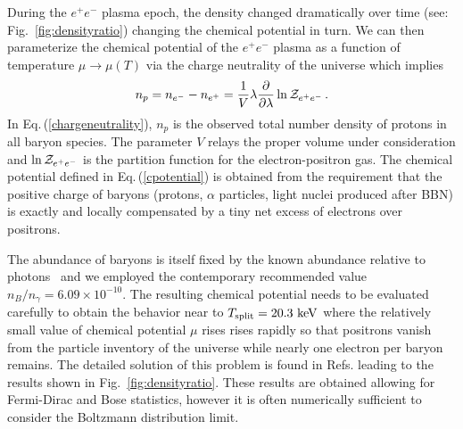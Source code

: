 \documentclass[reprint]{revtex4-2}
\newcommand*{\keV}{\text{ keV}}
\newcommand{\req}[1]{Eq.\,(\ref{#1})}
\newcommand{\rf}[1]{Fig.~{\ref{#1}}}
\newcommand*{\xblue}{\color{black}}
\begin{document}
{\xblue During the $e^{+}e^{-}$ plasma epoch, the density changed dramatically over time (see: \rf{fig:densityratio}) changing the chemical potential in turn. We can then parameterize the chemical potential of the $e^{+}e^{-}$ plasma as a function of temperature $\mu\rightarrow\mu(T)$ via the charge neutrality of the universe which implies}
\begin{align}
    \label{chargeneutrality}
    n_{p}=n_{e^{-}}-n_{e^{+}}=\frac{1}{V}\lambda\frac{\partial}{\partial\lambda}\ln{\cal Z}_{e^{+}e^{-}}\,.
\end{align}
{\xblue In \req{chargeneutrality}, $n_{p}$ is the observed total number density of protons in all baryon species. The parameter $V$ relays the proper volume under consideration and $\ln{\cal Z}_{e^{+}e^{-}}$ is the partition function for the electron-positron gas. The chemical potential defined in \req{cpotential} is obtained from the requirement that the positive charge of baryons (protons, $\alpha$ particles, light nuclei produced after BBN) is exactly and locally compensated by a tiny net excess of electrons over positrons.}

{\xblue The abundance of baryons is itself fixed by the known abundance relative to photons~\cite{workman2022pdg} and we employed the contemporary recommended value $n_B/n_\gamma=6.09\times 10^{-10}$.} The resulting chemical potential  needs to be evaluated carefully to obtain the behavior near to $T_{\rm split}=20.3\keV$ where the relatively {\xblue small value of chemical potential $\mu$} rises rises rapidly so that positrons vanish from the particle inventory of the universe while nearly one electron per baryon remains. The detailed solution of this problem is found in Refs.\;\cite{fromerth2012quarkgluon,rafelski2023short} leading to the results shown in \rf{fig:densityratio}. These results are obtained allowing for Fermi-Dirac and Bose statistics, however it is often numerically sufficient to consider the Boltzmann distribution limit.
\end{document}
